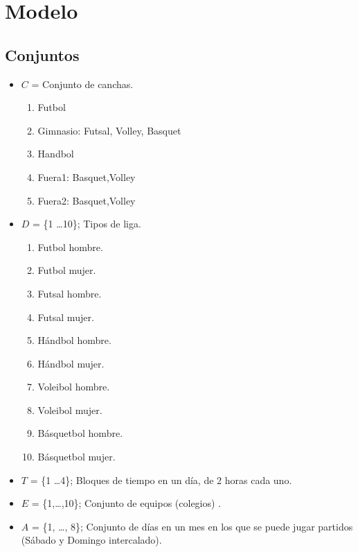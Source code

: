 
\section{Modelo}

\subsection{Conjuntos}
\begin{itemize}

    \item $C$ = Conjunto de canchas.
    \begin{enumerate}
        \item Futbol
        \item  Gimnasio: Futsal, Volley, Basquet
        \item Handbol
        \item Fuera1: Basquet,Volley
        \item Fuera2: Basquet,Volley

    \end{enumerate}
    
    \item $D$ = \{1 \dots 10\}; Tipos de liga. 
    \begin{enumerate}
    
        \item Futbol hombre.
        \item Futbol mujer.
        \item Futsal hombre.
        \item Futsal mujer.
        \item Hándbol hombre.
        \item Hándbol mujer.
        \item Voleibol hombre.
        \item Voleibol mujer.
        \item Básquetbol hombre.
        \item Básquetbol mujer.
        
    \end{enumerate}
    
    \item $T$ = \{1 \dots 4\}; Bloques de tiempo en un día, de 2 horas cada uno.
    
    \item $E$ = \{1,\dots,10\}; Conjunto de equipos (colegios) .
    
    \item $A$ = \{1, \dots, 8\}; Conjunto de días en un mes en los que se puede jugar partidos (Sábado y Domingo intercalado).
    
\end{itemize}

